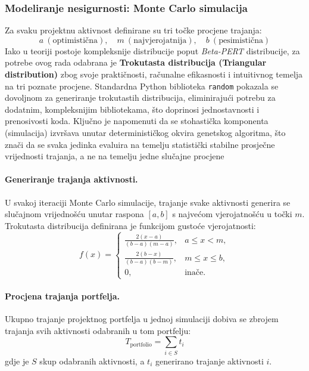 \subsubsection{Modeliranje nesigurnosti: Monte Carlo simulacija}

Za svaku projektnu aktivnost definirane su tri točke procjene trajanja:
\[
a \ (\text{optimistična}), \quad
m \ (\text{najvjerojatnija}), \quad
b \ (\text{pesimistična})
\]
Iako u teoriji postoje kompleksnije distribucije poput \textit{Beta-PERT} distribucije, 
za potrebe ovog rada odabrana je \textbf{Trokutasta distribucija (Triangular distribution)} 
zbog svoje praktičnosti, računalne efikasnosti i intuitivnog temelja na tri poznate procjene.
Standardna Python biblioteka \texttt{random} pokazala se dovoljnom za generiranje trokutastih distribucija, eliminirajući potrebu za dodatnim, kompleksnijim bibliotekama, što doprinosi jednostavnosti i prenosivosti koda. Ključno je napomenuti da se stohastička komponenta (simulacija) izvršava unutar determinističkog okvira genetskog algoritma, što znači da se svaka jedinka evaluira na temelju statistički stabilne prosječne vrijednosti trajanja, a ne na temelju jedne slučajne procjene
\paragraph{Generiranje trajanja aktivnosti.}
U svakoj iteraciji Monte Carlo simulacije, trajanje svake aktivnosti generira se slučajnom vrijednošću 
unutar raspona $[a, b]$ s najvećom vjerojatnošću u točki $m$.  
Trokutasta distribucija definirana je funkcijom gustoće vjerojatnosti:
\[
f(x) =
\begin{cases}
\frac{2(x-a)}{(b-a)(m-a)}, & a \leq x < m, \\
\frac{2(b-x)}{(b-a)(b-m)}, & m \leq x \leq b, \\
0, & \text{inače}.
\end{cases}
\]

\paragraph{Procjena trajanja portfelja.}
Ukupno trajanje projektnog portfelja u jednoj simulaciji dobiva se zbrojem trajanja svih aktivnosti odabranih u tom portfelju:
\[
T_{\text{portfolio}} = \sum_{i \in S} t_i
\]
gdje je $S$ skup odabranih aktivnosti, a $t_i$ generirano trajanje aktivnosti $i$.

